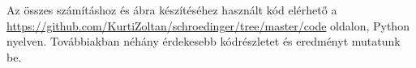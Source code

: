 Az összes számításhoz és ábra készítéséhez használt kód elérhető a \url{https://github.com/KurtiZoltan/schroedinger/tree/master/code} oldalon, Python nyelven. Továbbiakban néhány érdekesebb kódrészletet és eredményt mutatunk be.